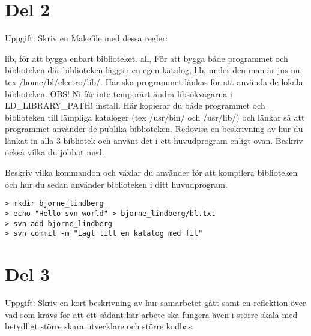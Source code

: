 \documentclass[10pt, a4paper]{article}
\begin{document}
\cleardoublepage

\section*{Del 2}\label{sec:del2}

Uppgift:
Skriv en Makefile med dessa regler:

lib, för att bygga enbart biblioteket.
all, För att bygga både programmet och biblioteken där biblioteken läggs i en egen katalog, lib,  under den man är jus nu, tex /home/bl/electro/lib/. Här ska programmet länkas för att använda de lokala biblioteken. OBS! Ni får inte temporärt ändra libsökvägarna i LD_LIBRARY_PATH!
install. Här kopierar du både programmet och biblioteken till lämpliga kataloger (tex /usr/bin/ och /usr/lib/) och länkar så att programmet använder de publika biblioteken.
Redovisa en beskrivning av hur du länkat in alla 3 bibliotek och använt det i ett huvudprogram enligt ovan. Beskriv också vilka du jobbat med.

Beskriv vilka kommandon och växlar du använder för att kompilera biblioteken och hur du sedan använder biblioteken i ditt huvudprogram.
 
\begin{verbatim}
> mkdir bjorne_lindberg
> echo "Hello svn world" > bjorne_lindberg/bl.txt
> svn add bjorne_lindberg
> svn commit -m "Lagt till en katalog med fil"
\end{verbatim}

\cleardoublepage

\section*{Del 3}\label{sec:del3}

Uppgift:
Skriv en kort beskrivning av hur samarbetet gått samt en reflektion över vad som krävs för att ett sådant här arbete ska fungera även i större skala med betydligt större skara utvecklare och större kodbas.
 





%  
\end{document}
